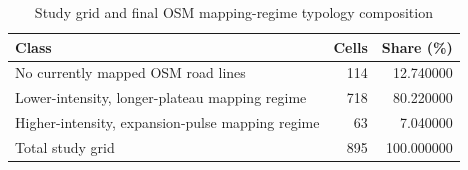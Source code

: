 \begin{table}
\caption{Study grid and final OSM mapping-regime typology composition}
\label{tab:table_01_study_grid_typology_composition}
\begin{tabular}{lrr}
\toprule
Class & Cells & Share (\%) \\
\midrule
No currently mapped OSM road lines & 114 & 12.740000 \\
Lower-intensity, longer-plateau mapping regime & 718 & 80.220000 \\
Higher-intensity, expansion-pulse mapping regime & 63 & 7.040000 \\
Total study grid & 895 & 100.000000 \\
\bottomrule
\end{tabular}
\end{table}

